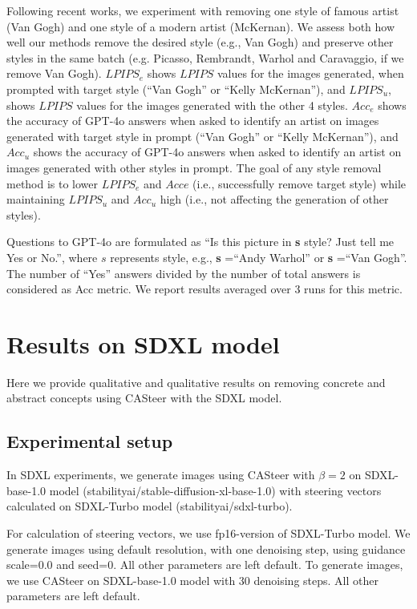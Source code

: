 Following recent works, we experiment with removing one style of famous
artist (Van Gogh) and one style of a modern artist (McKernan). We assess both how well our methods remove the desired style (e.g., Van Gogh) and preserve other styles in the
same batch (e.g. Picasso, Rembrandt, Warhol and Caravaggio, if we remove Van Gogh). $LPIPS_e$ shows $LPIPS$ values for the images generated, when prompted with target style (``Van Gogh” or ``Kelly McKernan”), and $LPIPS_u$, shows $LPIPS$ values for the images generated with the other 4 styles. $Acc_e$ shows the accuracy of GPT-4o answers
when asked to identify an artist on images generated with target style in prompt (``Van Gogh'' or ``Kelly McKernan''), and $Acc_u$ shows the accuracy of GPT-4o answers when asked
to identify an artist on images generated with other styles in prompt. The goal of any style removal method is to
lower $LPIPS_e$ and $Acce$ (i.e., successfully remove target style) while maintaining $LPIPS_u$ and $Acc_u$ high (i.e., not affecting the generation of other styles). 

Questions to GPT-4o are formulated as ``Is this picture in \textbf{s} style? Just tell me Yes or No.'', where $s$ represents style, e.g., \textbf{s} =``Andy Warhol'' or \textbf{s} =``Van Gogh''. The number
of ``Yes'' answers divided by the number of total answers is considered as Acc metric. We report results averaged over 3 runs for this metric.

\clearpage

\section{Results on SDXL model}
\label{sdxl_res}

Here we provide qualitative and qualitative results on removing concrete and abstract concepts using CASteer with the SDXL model.

\subsection{Experimental setup}

In SDXL experiments, we generate images using CASteer with $\beta=2$ on SDXL-base-1.0 model (stabilityai/stable-diffusion-xl-base-1.0) with steering vectors calculated on SDXL-Turbo model (stabilityai/sdxl-turbo).

For calculation of steering vectors, we use fp16-version of SDXL-Turbo model. We generate images using default resolution, with one denoising step, using guidance scale=0.0 and seed=0. All other parameters are left default. To generate images, we use CASteer on SDXL-base-1.0 model with 30 denoising steps. All other parameters are left default.

